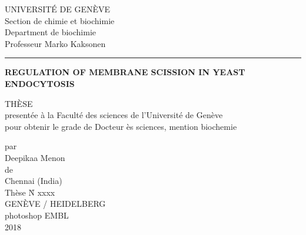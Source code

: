 \documentclass[
12pt, %
ngerman,
english, %
onehalfspacing,
hidelinks,
toctotoc, %
headsepline, %
]{MastersDoctoralThesis} %
\newcommand\blankpage{%
	\null
	\thispagestyle{empty}%
	\newpage}
\begin{document}
\frontmatter %

\pagestyle{plain} %

%
\begin{titlepage}

\noindent\large{UNIVERSIT\'E DE GEN\`EVE\\
Section de chimie et biochimie\\
Department de biochimie\\}
Professeur Marko Kaksonen\\
\noindent\rule{13.6cm}{0.4pt}

\vspace{2cm}
\begin{center}
\LARGE\textbf{REGULATION OF MEMBRANE SCISSION IN YEAST ENDOCYTOSIS} \\
	\vspace{1.5cm}
\end{center}

\begin{center}	
	{TH\`ESE\\
	present\'ee \`a la Facult\'e des sciences de l'Universit\'e de Gen\`eve\\
	pour obtenir le grade de Docteur \`es sciences, mention biochemie\\}

\vspace{1.5cm}
	par\\
	Deepikaa Menon\\
	de\\
	Chennai (India)\\
	\vspace{2cm}
	Th\`ese N\r{} xxxx\\
	\vspace{1cm}
	GEN\`EVE / HEIDELBERG\\
	photoshop EMBL\\	
	2018\\
	
	
\end{center}

\end{titlepage}
\end{document}
